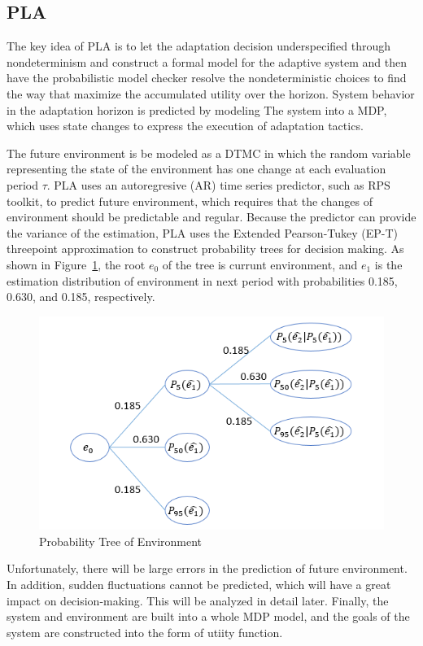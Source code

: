 \documentclass[sigconf]{acmart}
\begin{document}
\subsection{PLA}
The key idea of PLA is to let the adaptation decision underspecified through nondeterminism and construct a formal model for the adaptive system and then have the probabilistic model checker resolve the nondeterministic choices to find the way that maximize the accumulated utility over the horizon\cite{pla}. System behavior in the adaptation horizon is predicted by modeling The system into a MDP\cite{mdp}, which uses state changes to express the execution of adaptation tactics. 

The future environment is be modeled as a DTMC in which the random variable representing the state of the environment has one change at each evaluation period $\tau$. PLA uses an autoregresive (AR) time series predictor\cite{ar}, such as RPS toolkit\cite{rps}, to predict future environment, which requires that the changes of environment should be predictable and regular. Because the predictor can provide the variance of the estimation, PLA uses the Extended Pearson-Tukey (EP-T)\cite{ept} threepoint approximation to construct probability trees for decision making. As shown in Figure~\ref{envtree}, the root $e_{0}$ of the tree is currunt environment, and $e_{1}$ is the estimation distribution of environment in next period with probabilities 0.185, 0.630, and 0.185, respectively.
\begin{figure}[h]
	\centering
	\includegraphics[width=\linewidth]{envtree}
	\caption{Probability Tree of Environment}
	\label{envtree}
\end{figure}
Unfortunately, there will be large errors in the prediction of future environment. In addition, sudden fluctuations cannot be predicted, which will have a great impact on decision-making. This will be analyzed in detail later. Finally, the system and environment are built into a whole MDP model, and the goals of the system are constructed into the form of utiity function. 
\end{document}
